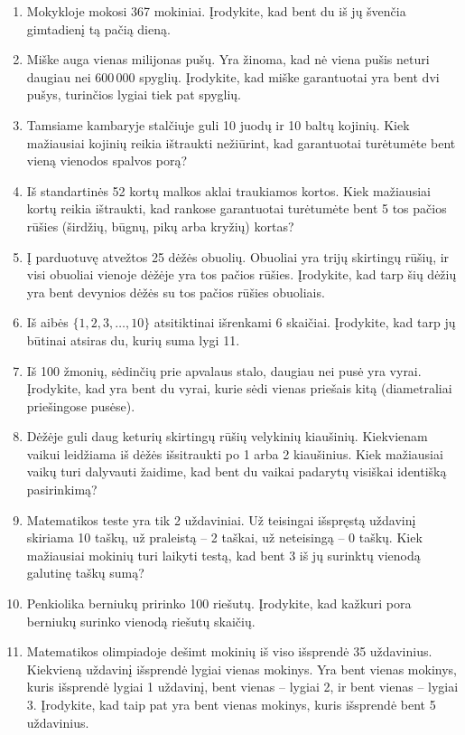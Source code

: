 \documentclass[11pt,a4paper]{scrartcl}
\begin{document}
\begin{enumerate}
    \item Mokykloje mokosi 367 mokiniai. Įrodykite, kad bent du iš jų švenčia gimtadienį tą pačią dieną.
    \item Miške auga vienas milijonas pušų. Yra žinoma, kad nė viena pušis neturi daugiau nei $600\,000$ spyglių. Įrodykite, kad miške garantuotai yra bent dvi pušys, turinčios lygiai tiek pat spyglių.
    \item Tamsiame kambaryje stalčiuje guli 10 juodų ir 10 baltų kojinių. Kiek mažiausiai kojinių reikia ištraukti nežiūrint, kad garantuotai turėtumėte bent vieną vienodos spalvos porą?
    \item Iš standartinės 52 kortų malkos aklai traukiamos kortos. Kiek mažiausiai kortų reikia ištraukti, kad rankose garantuotai turėtumėte bent 5 tos pačios rūšies (širdžių, būgnų, pikų arba kryžių) kortas?
    \item Į parduotuvę atvežtos 25 dėžės obuolių. Obuoliai yra trijų skirtingų rūšių, ir visi obuoliai vienoje dėžėje yra tos pačios rūšies. Įrodykite, kad tarp šių dėžių yra bent devynios dėžės su tos pačios rūšies obuoliais.
    \item Iš aibės $\{1, 2, 3, \dots, 10\}$ atsitiktinai išrenkami 6 skaičiai. Įrodykite, kad tarp jų būtinai atsiras du, kurių suma lygi 11.
    \item Iš 100 žmonių, sėdinčių prie apvalaus stalo, daugiau nei pusė yra vyrai. Įrodykite, kad yra bent du vyrai, kurie sėdi vienas priešais kitą (diametraliai priešingose pusėse).
    \item Dėžėje guli daug keturių skirtingų rūšių velykinių kiaušinių. Kiekvienam vaikui leidžiama iš dėžės išsitraukti po 1 arba 2 kiaušinius. Kiek mažiausiai vaikų turi dalyvauti žaidime, kad bent du vaikai padarytų visiškai identišką pasirinkimą?
    \item Matematikos teste yra tik 2 uždaviniai. Už teisingai išspręstą uždavinį skiriama 10 taškų, už praleistą – 2 taškai, už neteisingą – 0 taškų. Kiek mažiausiai mokinių turi laikyti testą, kad bent 3 iš jų surinktų vienodą galutinę taškų sumą?
    \item Penkiolika berniukų pririnko 100 riešutų. Įrodykite, kad kažkuri pora berniukų surinko vienodą riešutų skaičių.
    \item Matematikos olimpiadoje dešimt mokinių iš viso išsprendė 35 uždavinius. Kiekvieną uždavinį išsprendė lygiai vienas mokinys. Yra bent vienas mokinys, kuris išsprendė lygiai 1 uždavinį, bent vienas – lygiai 2, ir bent vienas – lygiai 3. Įrodykite, kad taip pat yra bent vienas mokinys, kuris išsprendė bent 5 uždavinius.

\end{enumerate}
\end{document}
